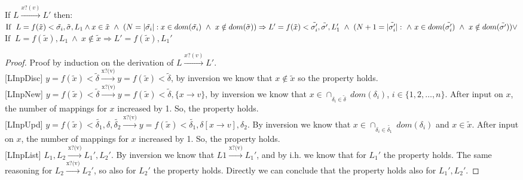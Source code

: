 \begin{proposition} If $L \xrightarrow{x?(v)} L'$ then: \\
$\mbox{If }\ L=f(\tilde{x})<\tilde{\sigma_i},\tilde{\sigma},L_1 \wedge x \in \tilde{x} \ \wedge \  (N=| \tilde{ \sigma_i}|: x \in dom (\tilde{\delta_i}) \ \wedge \  x \notin dom(\tilde{\delta})) \Rightarrow \\
L'=f(\tilde{x})<\tilde{\delta_i'},\tilde{\delta'},L_1'\  \wedge \  (N+1=|\tilde{\delta_i'}|: \ \wedge  \ x \in dom(\tilde{\delta_i'}) \ \wedge \  x \notin dom(\tilde{\delta'})) \lor$ \\
$\mbox{If }\ L=f(\tilde{x}),L_1 \ \wedge \ x\notin \tilde{x} \Rightarrow L'=f(\tilde{x}),L_1'$

\end{proposition}




\begin{proof} Proof by induction on the derivation of $L \xrightarrow{x?(v)} L'$.\\

[LInpDisc] $y=f(\tilde{x})<\tilde{\delta}\xrightarrow{\text{x?(v)}}y=f(\tilde{x})<\tilde{\delta}$, by inversion we know that $x\notin \tilde{x}$ so the property holds.\\

[LInpNew] $y=f(\tilde{x})<\tilde{\delta}\xrightarrow{\text{x?(v)}}y=f(\tilde{x})<\tilde{\delta},\{x\rightarrow v\}$, by inversion we know that $x\in \cap_{\delta_i \in \tilde{\delta}} \  dom(\delta_i)$, $i\in \{1,2,\dots,n\}$. After input on $x$, the number of mappings for $x$ increased by 1. So, the property holds.\\

[LInpUpd] $y=f(\tilde{x})<\tilde{\delta_1},\delta,\tilde{\delta_2}\xrightarrow{\text{x?(v)}}y=f(\tilde{x})<\tilde{\delta_1},\delta [x\rightarrow v],\delta_2$. By inversion we know that $x\in \cap_{\delta_i \in \tilde{\delta_1}} \  dom(\delta_i)$ and $x\in\tilde{x}$. After input on $x$,  the number of mappings for $x$ increased by 1. So, the property holds.\\


[LInpList] $L_1,L_2 \xrightarrow{\text{x?(v)}} L_1',L_2'$. By inversion we know that $L1\xrightarrow{\text{x?(v)}}L_1'$, and by i.h. we know that for $L_1'$ the property holds. The same reasoning for $L_2\xrightarrow{\text{x?(v)}}L_2'$, so also for $L_2'$ the property holds. Directly we can conclude that the property holds also for $L_1',L_2'$.



 \end{proof}
 
